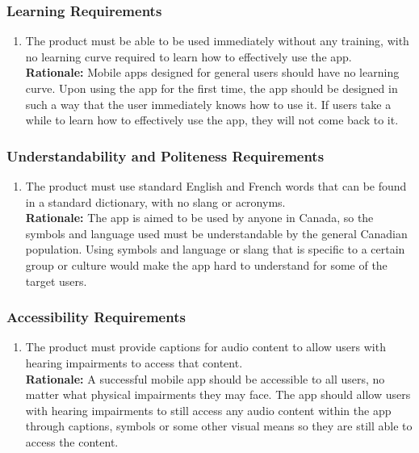 \documentclass[]{article}
\begin{document}
\subsubsection{Learning Requirements}
\label{ssub:learning_requirements}
\begin{enumerate}[{UH-L}1. ]
	\item The product must be able to be used immediately without any training, with no learning curve required to learn how to effectively use the app. \\
	{\bf Rationale:} Mobile apps designed for general users should have no learning curve. Upon using the app for the first time, the app should be designed in such a way that the user immediately knows how to use it. If users take a while to learn how to effectively use the app, they will not come back to it.
\end{enumerate}

\subsubsection{Understandability and Politeness Requirements}
\label{ssub:understandability_and_politeness_requirements}
\begin{enumerate}[{UH-UP}1. ]
	\item The product must use standard English and French words that can be found in a standard dictionary, with no slang or acronyms. \\
	{\bf Rationale:} The app is aimed to be used by anyone in Canada, so the symbols and language used must be understandable by the general Canadian population. Using symbols and language or slang that is specific to a certain group or culture would make the app hard to understand for some of the target users.
\end{enumerate}

\subsubsection{Accessibility Requirements}
\label{ssub:accessibility_requirements}
\begin{enumerate}[{UH-A}1. ]
	\item The product must provide captions for audio content to allow users with hearing impairments to access that content. \\
	{\bf Rationale:} A successful mobile app should be accessible to all users, no matter what physical impairments they may face. The app should allow users with hearing impairments to still access any audio content within the app through captions, symbols or some other visual means so they are still able to access the content.
\end{enumerate}
\end{document}
